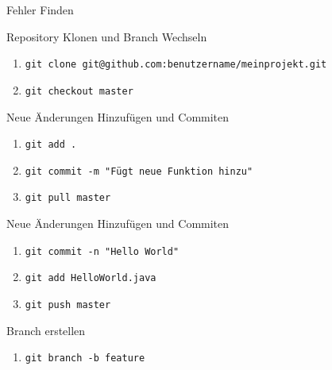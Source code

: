 \documentclass[
    english,
    accentcolor=TUDa-1c,
    fontsize= 12pt,
    a4paper,
    aspectratio=169,
    colorback=true,
    fancy_row_colors,
    boxarc=3pt,
]{algoexercise}
\begin{document}
    \begin{task}{Fehler Finden}

        \begin{subtask*}{Repository Klonen und Branch Wechseln}
            \begin{enumerate}
                \item \texttt{git clone git@github.com:benutzername/meinprojekt.git}
                \item \texttt{git checkout master}
            \end{enumerate}
        \end{subtask*}

        \begin{subtask*}{Neue Änderungen Hinzufügen und Commiten}
            \begin{enumerate}
                \item \texttt{git add .}
                \item \texttt{git commit -m "Fügt neue Funktion hinzu"}
                \item \texttt{git pull master}
            \end{enumerate}
        \end{subtask*}

        \begin{subtask*}{Neue Änderungen Hinzufügen und Commiten}
            \begin{enumerate}
                \item \texttt{git commit -n "Hello World"}
                \item \texttt{git add HelloWorld.java}
                \item \texttt{git push master}
            \end{enumerate}
        \end{subtask*}

        \begin{subtask*}{Branch erstellen}
            \begin{enumerate}
                \item \texttt{git branch -b feature}
            \end{enumerate}
        \end{subtask*}
    \end{task}
\end{document}
